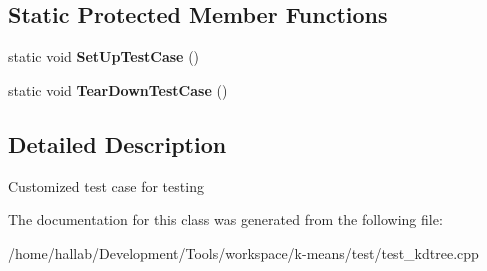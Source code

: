 \subsection*{Static Protected Member Functions}
\begin{DoxyCompactItemize}
\item 
\hypertarget{classKDTreeTest_ad769deefe40a92b3865c2ee88a47bd10}{static void {\bfseries Set\-Up\-Test\-Case} ()}\label{classKDTreeTest_ad769deefe40a92b3865c2ee88a47bd10}

\item 
\hypertarget{classKDTreeTest_a3ba954652e64b01aabfc4e2448758d55}{static void {\bfseries Tear\-Down\-Test\-Case} ()}\label{classKDTreeTest_a3ba954652e64b01aabfc4e2448758d55}

\end{DoxyCompactItemize}


\subsection{Detailed Description}
Customized test case for testing 

The documentation for this class was generated from the following file\-:\begin{DoxyCompactItemize}
\item 
/home/hallab/\-Development/\-Tools/workspace/k-\/means/test/test\-\_\-kdtree.\-cpp\end{DoxyCompactItemize}
